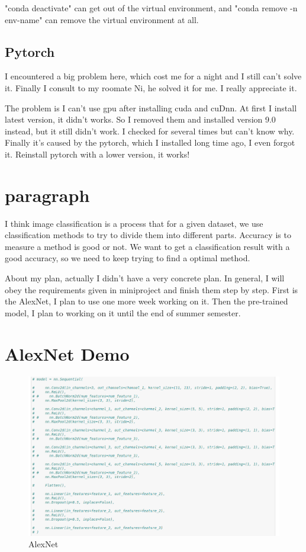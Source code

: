 \documentclass{article} %
\begin{document}
"conda deactivate" can get out of the virtual environment, and "conda remove -n env-name" can remove the virtual environment at all.

\subsection{Pytorch}
I encountered a big problem here, which cost me for a night and I still can't solve it. Finally I consult to my roomate Ni, he solved it for me. I really appreciate it.

The problem is I can't use gpu after installing cuda and cuDnn. At first I install latest version, it didn't works. So I removed them and installed version 9.0 instead, but it still didn't work. I checked for several times but  can't know why. Finally it's caused by the pytorch, which I installed long time ago, I even forgot it. Reinstall pytorch with a lower version, it works!

\section{paragraph}
I think image classification is a process that for a given dataset, we use classification methods to try to divide them into different parts. Accuracy is to measure a method is good or not. We want to get a classification result with a good accuracy, so we need to keep trying to find a optimal method.

About my plan, actually I didn't have a very concrete plan. In general, I will obey the requirements given in miniproject and finish them step by step. First is the AlexNet, I plan to use one more week working on it. Then the pre-trained model, I plan to working on it until the end of summer semester.

\section{AlexNet Demo}

\begin{figure}[ht]
	\centering  %
	\includegraphics[width=1\textwidth]{1.png} 
	\caption{AlexNet}  %
	\label{fig:f1}   %
\end{figure}
\end{document}

